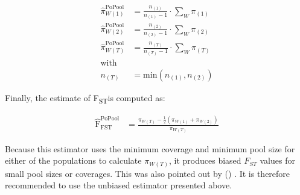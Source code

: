 \documentclass[a4paper,9pt,DIV=14]{scrartcl}
\newcounter{todo}
\newcommand\todo[1]{}
\newcommand\secref[1]{Section~(\ref{#1})}
\newcommand{\fst}{F\textsubscript{ST}}
\newcommand\citeay[1]{\citeauthor{#1} (\citeyear{#1}) \cite{#1}}
\begin{document}
\begin{align}
    \label{eq:PoPoolation2FstWindow:1}
    \widehat{\pi}_{W(1)}^\text{PoPool} &= \frac{n_{(1)}}{n_{(1)}-1} \cdot \sum_{W} \pi_{(1)} \\
    \label{eq:PoPoolation2FstWindow:2}
    \widehat{\pi}_{W(2)}^\text{PoPool} &= \frac{n_{(2)}}{n_{(2)}-1} \cdot \sum_{W} \pi_{(2)} \\
    \label{eq:PoPoolation2FstWindow:T}
    \widehat{\pi}_{W(T)}^\text{PoPool} &= \frac{n_{(T)}}{n_{(T)}-1} \cdot \sum_{W} \pi_{(T)} \\
    \nonumber
    \mbox{with} \\
    \nonumber
    n_{(T)} &= \mbox{min} \left( n_{(1)}, n_{(2)} \right)
\end{align}

Finally, the estimate of \fst is computed as:

\begin{align}
    \label{eq:PoPoolation2FstEst}
    \widehat{\text{F}}_\text{FST}^\text{PoPool} &= \frac{\pi_{W(T)} - \frac{1}{2} \left( \pi_{W(1)} + \pi_{W(2)} \right)}{\pi_{W(T)}}
\end{align}

\todo{Jeff, please check:} Because this estimator uses the minimum coverage and minimum pool size for either of the populations to calculate $\pi_{W(T)}$, it produces biased $F_{ST}$ values for small pool sizes or coverages. This was also pointed out by \citeay{Hivert2018}. It is therefore recommended to use the unbiased estimator presented above.
\todo{(Moi) I have given it a try to explain the bias, I think is just the minimum coverage or n simplification.}
\todo{Jeff, please check and expand the rational of the last sentence as needed.}
\todo{TBD: See \secref{supp:sec:FST:sub:Comparison} for an evaluation of the biases introduced by this estimator.}


\end{document}
